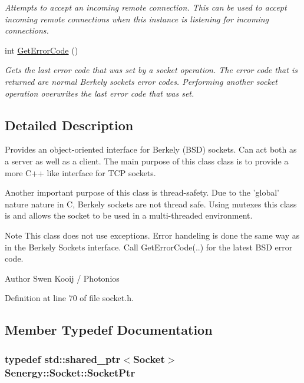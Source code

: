 \begin{DoxyCompactItemize}
\begin{DoxyCompactList}\small\item\em Attempts to accept an incoming remote connection. This can be used to accept incoming remote connections when this instance is listening for incoming connections. \end{DoxyCompactList}\item 
int \hyperlink{class_senergy_1_1_socket_a403f7a2f6c5a94d4b14f73f0965da061}{Get\-Error\-Code} ()
\begin{DoxyCompactList}\small\item\em Gets the last error code that was set by a socket operation. The error code that is returned are normal Berkely sockets error codes. Performing another socket operation overwrites the last error code that was set. \end{DoxyCompactList}\end{DoxyCompactItemize}


\subsection{Detailed Description}
Provides an object-\/oriented interface for Berkely (B\-S\-D) sockets. Can act both as a server as well as a client. The main purpose of this class class is to provide a more C++ like interface for T\-C\-P sockets. 

Another important purpose of this class is thread-\/safety. Due to the 'global' nature nature in C, Berkely sockets are not thread safe. Using mutexes this class is and allows the socket to be used in a multi-\/threaded environment.

\begin{DoxyNote}{Note}
This class does not use exceptions. Error handeling is done the same way as in the Berkely Sockets interface. Call Get\-Error\-Code(..) for the latest B\-S\-D error code.
\end{DoxyNote}
\begin{DoxyAuthor}{Author}
Swen Kooij / Photonios 
\end{DoxyAuthor}


Definition at line 70 of file socket.\-h.



\subsection{Member Typedef Documentation}
\hypertarget{class_senergy_1_1_socket_ac9ff20ce80df2d0c2900cd0940ffe860}{
\subsubsection[{Socket\-Ptr}]{\setlength{\rightskip}{0pt plus 5cm}typedef std\-::shared\-\_\-ptr$<${\bf Socket}$>$ {\bf Senergy\-::\-Socket\-::\-Socket\-Ptr}}}\label{class_senergy_1_1_socket_ac9ff20ce80df2d0c2900cd0940ffe860}


